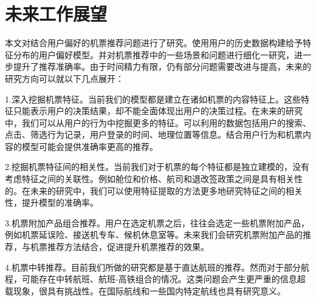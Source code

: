 \section{未来工作展望}

本文对结合用户偏好的机票推荐问题进行了研究。使用用户的历史数据构建给予特征分布的用户偏好模型。并对机票推荐中的一些场景和问题进行细化一研究，进一步提升了推荐准确率。由于时间精力有限，仍有部分问题需要改进与提高，未来的研究方向可以就以下几点展开：

1.深入挖掘机票特征。当前我们的模型都是建立在诸如机票的内容特征上。这些特征只能表示用户的决策结果，却不能全面体现出用户的决策过程。在未来的研究中，我们可以从用户的行为中挖掘更多的特征。可以利用的数据包括用户的搜索、点击、筛选行为记录，用户登录的时间、地理位置等信息。结合用户行为和机票内容的模型可能会提供准确率更高的推荐。

2.挖掘机票特征间的相关性。当前我们对于机票的每个特征都是独立建模的，没有考虑特征之间的关联性。例如舱位和价格、航司和退改签政策之间是具有相关性的。在未来的研究中，我们可以使用特征提取的方法更多地研究特征之间的相关性，提升模型的准确率。

3.机票附加产品组合推荐。用户在选定机票之后，往往会选定一些机票附加产品，例如机票延误险、接送机专车、候机休息室等。未来我们会研究机票附加产品的推荐，与机票推荐方法结合，促进提升机票推荐的效果。

4.机票中转推荐。目前我们所做的研究都是基于直达航班的推荐。然而对于部分航程，可能存在中转航班、航班-高铁组合的情况。这类问题会产生更严重的信息超载现象，很具有挑战性。在国际航线和一些国内特定航线也具有研究意义。
